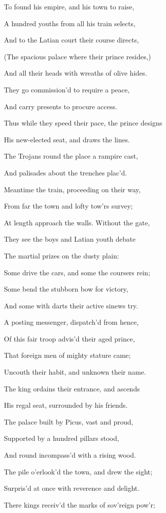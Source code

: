To found his empire, and his town to raise,

A hundred youths from all his train selects,

And to the Latian court their course directs,

(The spacious palace where their prince resides,)

And all their heads with wreaths of olive hides.

They go commission’d to require a peace,

And carry presents to procure access.

Thus while they speed their pace, the prince designs

His new-elected seat, and draws the lines.

The Trojans round the place a rampire cast,

And palisades about the trenches plac’d.

Meantime the train, proceeding on their way,

From far the town and lofty tow’rs survey;

At length approach the walls. Without the gate,

They see the boys and Latian youth debate

The martial prizes on the dusty plain:

Some drive the cars, and some the coursers rein;

Some bend the stubborn bow for victory,

And some with darts their active sinews try.

A posting messenger, dispatch’d from hence,

Of this fair troop advis’d their aged prince,

That foreign men of mighty stature came;

Uncouth their habit, and unknown their name.

The king ordains their entrance, and ascends

His regal seat, surrounded by his friends.

The palace built by Picus, vast and proud,

Supported by a hundred pillars stood,

And round incompass’d with a rising wood.

The pile o’erlook’d the town, and drew the sight;

Surpris’d at once with reverence and delight.

There kings receiv’d the marks of sov’reign pow’r;

